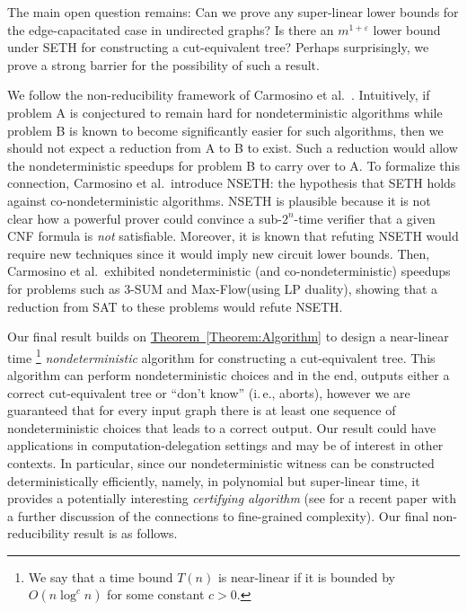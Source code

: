 \documentclass[11pt]{article}
\numberwithin{equation}{section}
\theoremstyle{definition}
\theoremstyle{plain}
\newcommand{\ie}{i.\,e.}
\newcommand{\expref}[2]{\hyperref[#2]{#1~\ref{#2}}}
\theoremstyle{plain}
\newcommand{\ProblemName}[1]{\textsf{#1}}
\newcommand{\MF}{\ProblemName{Max-Flow}\xspace}
\newcommand{\SETH}{SETH\xspace}
\newcommand{\NSETH}{NSETH\xspace}
\newcommand\eps{\varepsilon}
\begin{document}
%



\medskip

The main open question remains: Can we prove any super-linear lower bounds for the edge-capacitated case in undirected graphs? Is there an $m^{1+\eps}$ lower bound under \SETH for constructing a cut-equivalent tree?
Perhaps surprisingly, we prove a strong barrier for the possibility of such a result.

We follow the non-reducibility framework of Carmosino et al.~\cite{carmosino2016nondeterministic}.
Intuitively, if problem A is conjectured to remain hard for nondeterministic algorithms while problem B is known to become significantly easier for such algorithms, then we should not expect a reduction from A to B to exist. Such a reduction would allow the nondeterministic speedups for problem B to carry over to A.
To formalize this connection, Carmosino et al.\ introduce \NSETH: the hypothesis that \SETH holds against co-nondeterministic algorithms.
\NSETH is plausible because it is not clear how a powerful prover could convince a sub-$2^{n}$-time verifier that a given CNF formula is \emph{not} satisfiable.
Moreover, it is known that refuting \NSETH
%
would require  %
new techniques since it
%
would imply  %
new circuit lower bounds.
Then, Carmosino et al.\ exhibited nondeterministic (and co-nondeterministic) speedups for problems such as $3$-SUM and \MF (using LP duality), showing that a reduction from SAT to these problems would refute \NSETH.

Our final result builds on \expref{Theorem}{Theorem:Algorithm} to design
a near-linear time%
\footnote{We say that a time bound $T(n)$ is near-linear
  if it is bounded by $O(n\log^c n)$ for some constant $c>0$.
}
\emph{nondeterministic} algorithm for constructing a cut-equivalent tree.
This algorithm can perform nondeterministic choices and in the end,
outputs either a correct cut-equivalent tree or ``don't know'' (\ie, aborts),
however we are guaranteed that for every input graph there is at least one sequence of nondeterministic choices that leads to a correct output.
Our result could have applications in computation-delegation settings and may be of interest in other contexts.
In particular, since our nondeterministic witness can be constructed deterministically efficiently, namely, in polynomial but super-linear time,
it provides a potentially interesting \emph{certifying algorithm} \cite{certify_survey11,alkassar2011verification} (see \cite{Kunnemann18} for a recent paper with a further discussion of the connections to fine-grained complexity).
Our final non-reducibility result is as follows.
\end{document}
